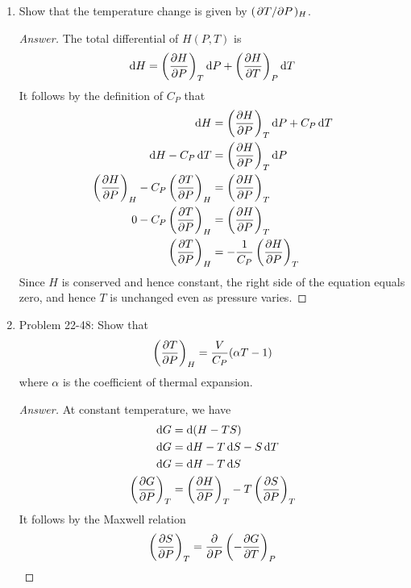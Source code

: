 \documentclass[../psets.tex]{subfiles}
\begin{document}
\begin{enumerate}
\begin{enumerate}
\begin{proof}[Answer]
        \end{proof}
        \item Show that the temperature change is given by $(\pdv*{T}{P})_H$.
        \begin{proof}[Answer]
            The total differential of $H(P,T)$ is
            \begin{equation*}
                \dd{H} = \left( \pdv{H}{P} \right)_T\dd{P}+\left( \pdv{H}{T} \right)_P\dd{T}
            \end{equation*}
            It follows by the definition of $C_P$ that
            \begin{align*}
                \dd{H} &= \left( \pdv{H}{P} \right)_T\dd{P}+C_P\dd{T}\\
                \dd{H}-C_P\dd{T} &= \left( \pdv{H}{P} \right)_T\dd{P}\\
                \left( \pdv{H}{P} \right)_H-C_P\left( \pdv{T}{P} \right)_H &= \left( \pdv{H}{P} \right)_T\\
                0-C_P\left( \pdv{T}{P} \right)_H &= \left( \pdv{H}{P} \right)_T\\
                \left( \pdv{T}{P} \right)_H &= -\frac{1}{C_P}\left( \pdv{H}{P} \right)_T
            \end{align*}
            Since $H$ is conserved and hence constant, the right side of the equation equals zero, and hence $T$ is unchanged even as pressure varies.
        \end{proof}
        \item Problem 22-48: Show that
        \begin{equation*}
            \left( \pdv{T}{P} \right)_H = \frac{V}{C_P}(\alpha T-1)
        \end{equation*}
        where $\alpha$ is the coefficient of thermal expansion.
        \begin{proof}[Answer]
            At constant temperature, we have
            \begin{align*}
                \dd{G} &= \dd{(H-TS)}\\
                \dd{G} &= \dd{H}-T\dd{S}-S\dd{T}\\
                \dd{G} &= \dd{H}-T\dd{S}\\
                \left( \pdv{G}{P} \right)_T &= \left( \pdv{H}{P} \right)_T-T\left( \pdv{S}{P} \right)_T
            \end{align*}
            It follows by the Maxwell relation
            \begin{equation*}
                \left( \pdv{S}{P} \right)_T = \pdv{P}\left( -\pdv{G}{T} \right)_P

\end{equation*}
\end{proof}
\end{enumerate}
\end{enumerate}
\end{document}
